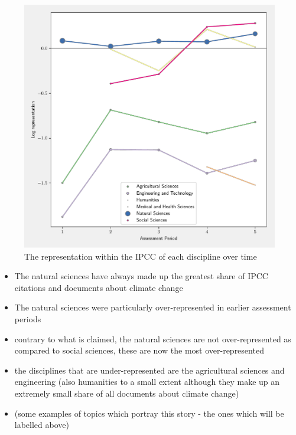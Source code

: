 \documentclass{article}
\begin{document}
\bigskip

\begin{figure}[h!]
	\begin{center}
		\includegraphics[width=0.85\linewidth]{plots/ipcc_representation/ipcc_rep_oecds_time.pdf}
		\caption{The representation within the IPCC of each discipline over time}
		\label{oecd_rep}
	\end{center}
\end{figure}

\begin{itemize}
	\item The natural sciences have always made up the greatest share of IPCC citations and documents about climate change
	\item The natural sciences were particularly over-represented in earlier assessment periods
	\item contrary to what is claimed, the natural sciences are not over-represented as compared to social sciences, these are now the most over-represented
	\item the disciplines that are under-represented are the agricultural sciences and engineering (also humanities to a small extent although they make up an extremely small share of all documents about climate change)
	\item (some examples of topics which portray this story - the ones which will be labelled above)
\end{itemize}

\bigskip
\end{document}
